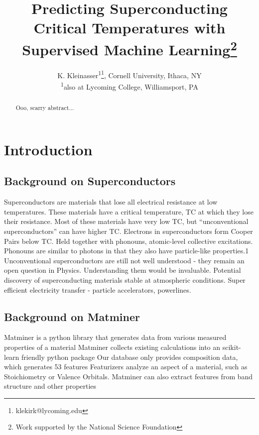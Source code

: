 \documentclass[a4paper,
               keeplastbox,   %
               ]{jacow}
\begin{document}
\title{Predicting Superconducting Critical Temperatures with Supervised Machine Learning\thanks{Work supported by the National Science Foundation}}

\author{K. Kleinasser\textsuperscript{1}\thanks{klekirk@lycoming.edu}, Cornell University, Ithaca, NY\\ \textsuperscript{1}also at Lycoming College, Williamsport, PA}
	
\maketitle

%
\begin{abstract}
   Ooo, scarry abstract...
\end{abstract}


\section{Introduction}
\subsection{Background on Superconductors}
Superconductors are materials that lose all electrical resistance at low temperatures. These materials have a critical temperature, TC at which they lose their resistance. Most of these materials have very low TC, but “unconventional superconductors” can have higher TC. Electrons in superconductors form Cooper Pairs below TC. Held together with phonouns, atomic-level collective excitations. Phonouns are similar to photons in that they also have particle-like properties.1
Unconventional superconductors are still not well understood - they remain an open question in Physics. Understanding them would be invaluable. Potential discovery of superconducting materials stable at atmospheric conditions. Super efficient electricity transfer - particle accelerators, powerlines.


\subsection{Background on Matminer}
Matminer is a python library that generates data from various measured properties of a material
Matminer collects existing calculations into an scikit-learn friendly python package
Our database only provides composition data, which generates 53 features 
Featurizers analyze an aspect of a material, such as Stoichiometry or Valence Orbitals.
Matminer can also extract features from band structure and other properties 
\end{document}
